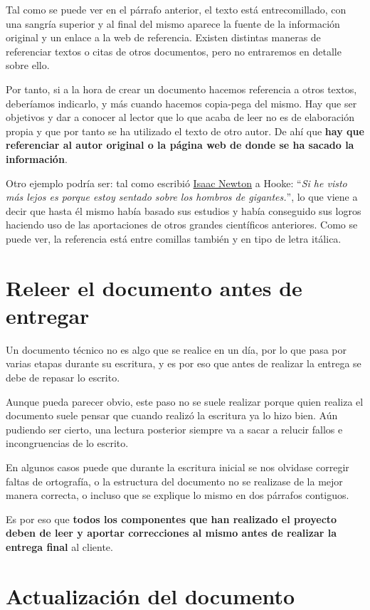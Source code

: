 Tal como se puede ver en el párrafo anterior, el texto está entrecomillado, con una sangría superior y al final del mismo aparece la fuente de la información original y un enlace a la web de referencia. Existen distintas maneras de referenciar textos o citas de otros documentos, pero no entraremos en detalle sobre ello.


Por tanto, si a la hora de crear un documento hacemos referencia a otros textos, deberíamos indicarlo, y más cuando hacemos copia-pega del mismo. Hay que ser objetivos y dar a conocer al lector que lo que acaba de leer no es de elaboración propia y que por tanto se ha utilizado el texto de otro autor. De ahí que \textbf{hay que referenciar al autor original o la página web de donde se ha sacado la información}.

Otro ejemplo podría ser: tal como escribió \href{https://es.wikipedia.org/wiki/Isaac_Newton}{Isaac Newton} a Hooke: “\textit{Si he visto más lejos es porque estoy sentado sobre los hombros de gigantes.}”, lo que viene a decir que hasta él mismo había basado sus estudios y había conseguido sus logros haciendo uso de las aportaciones de otros grandes científicos anteriores. Como se puede ver, la referencia está entre comillas también y en tipo de letra itálica.


\chapter{Releer el documento antes de entregar}
Un documento técnico no es algo que se realice en un día, por lo que pasa por varias etapas durante su escritura, y es por eso que antes de realizar la entrega se debe de repasar lo escrito.

Aunque pueda parecer obvio, este paso no se suele realizar porque quien realiza el documento suele pensar que cuando realizó la escritura ya lo hizo bien. Aún pudiendo ser cierto, una lectura posterior siempre va a sacar a relucir fallos e incongruencias de lo escrito.

En algunos casos puede que durante la escritura inicial se nos olvidase corregir faltas de ortografía, o la estructura del documento no se realizase de la mejor manera correcta, o incluso que se explique lo mismo en dos párrafos contiguos.

Es por eso que \textbf{todos los componentes que han realizado el proyecto deben de leer y aportar correcciones al mismo antes de realizar la entrega final} al cliente.


\chapter{Actualización del documento}

